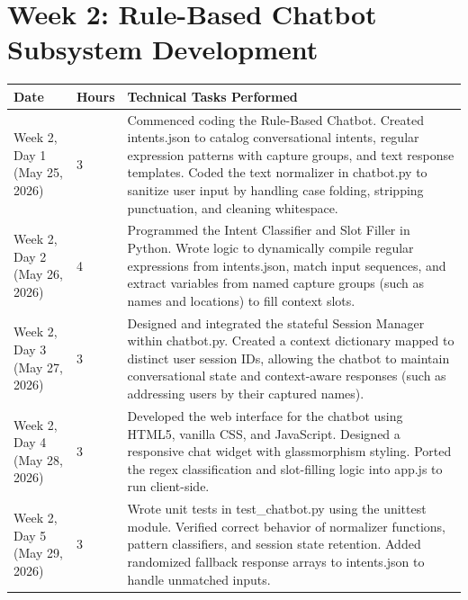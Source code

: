 \documentclass[11pt,a4paper]{article}
\begin{document}
\newpage

\section*{Week 2: Rule-Based Chatbot Subsystem Development}
\begin{longtable}{L{2.8cm} C{1.2cm} L{10.5cm}}
    \toprule
    \textbf{Date} & \textbf{Hours} & \textbf{Technical Tasks Performed} \\
    \midrule
    \endhead
    \bottomrule
    \endfoot
    \bottomrule
    \endlastfoot
    Week 2, Day 1 \newline (May 25, 2026) & 3 & Commenced coding the Rule-Based Chatbot. Created intents.json to catalog conversational intents, regular expression patterns with capture groups, and text response templates. Coded the text normalizer in chatbot.py to sanitize user input by handling case folding, stripping punctuation, and cleaning whitespace. \\
    \addlinespace
    Week 2, Day 2 \newline (May 26, 2026) & 4 & Programmed the Intent Classifier and Slot Filler in Python. Wrote logic to dynamically compile regular expressions from intents.json, match input sequences, and extract variables from named capture groups (such as names and locations) to fill context slots. \\
    \addlinespace
    Week 2, Day 3 \newline (May 27, 2026) & 3 & Designed and integrated the stateful Session Manager within chatbot.py. Created a context dictionary mapped to distinct user session IDs, allowing the chatbot to maintain conversational state and context-aware responses (such as addressing users by their captured names). \\
    \addlinespace
    Week 2, Day 4 \newline (May 28, 2026) & 3 & Developed the web interface for the chatbot using HTML5, vanilla CSS, and JavaScript. Designed a responsive chat widget with glassmorphism styling. Ported the regex classification and slot-filling logic into app.js to run client-side. \\
    \addlinespace
    Week 2, Day 5 \newline (May 29, 2026) & 3 & Wrote unit tests in test\_chatbot.py using the unittest module. Verified correct behavior of normalizer functions, pattern classifiers, and session state retention. Added randomized fallback response arrays to intents.json to handle unmatched inputs. \\
\end{longtable}
\end{document}
